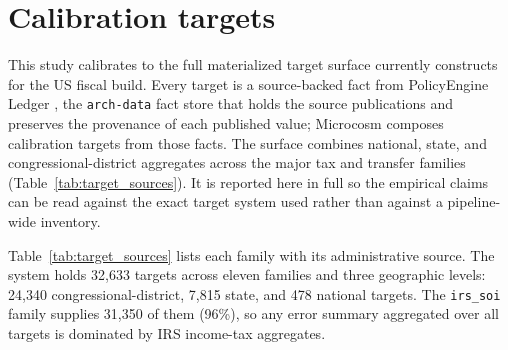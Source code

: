 \appendix

\section{Calibration targets}
\label{app:targets}

This study calibrates to the full materialized target surface \microcosm{} currently constructs for the
US fiscal build. Every target is a source-backed fact from PolicyEngine Ledger \citep{ledger2026}, the
\texttt{arch-data} fact store that holds the source publications and preserves the provenance of each
published value; Microcosm composes calibration targets from those facts. The surface combines national,
state, and congressional-district aggregates across the major tax and transfer families
(Table~\ref{tab:target_sources}). It is reported here in full so the empirical claims can be read against
the exact target system used rather than against a pipeline-wide inventory.

Table~\ref{tab:target_sources} lists each family with its administrative source. The system holds
32{,}633 targets across eleven families and three geographic levels: 24{,}340 congressional-district,
7{,}815 state, and 478 national targets. The \texttt{irs\_soi} family supplies 31{,}350 of them (96\%),
so any error summary aggregated over all targets is dominated by IRS income-tax aggregates.

